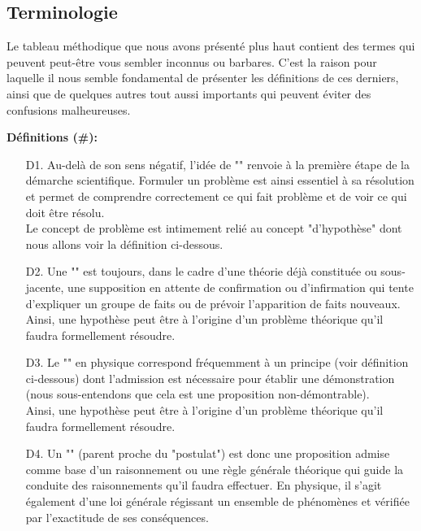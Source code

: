 	\pagebreak
	\subsection{Terminologie}

Le tableau m\'ethodique que nous avons pr\'esent\'e plus haut contient des termes qui peuvent peut-être vous sembler inconnus ou barbares. C'est la raison pour laquelle il nous semble fondamental de pr\'esenter les d\'efinitions de ces derniers, ainsi que de quelques autres tout aussi importants qui peuvent \'eviter des confusions malheureuses.

\textbf{D\'efinitions (\#\mydef):}

\begin{itemize}
	\item[D1.] Au-delà de son sens n\'egatif, l'id\'ee de "" renvoie à la première \'etape de la d\'emarche scientifique. Formuler un problème est ainsi essentiel à sa r\'esolution et permet de comprendre correctement ce qui fait problème et de voir ce qui doit être r\'esolu.\\
	
	Le concept de problème est intimement reli\'e au concept "d'hypothèse" dont nous allons voir la d\'efinition ci-dessous.

	\item[D2.] Une "" est toujours, dans le cadre d'une th\'eorie d\'ejà constitu\'ee ou sous-jacente, une supposition en attente de confirmation ou d'infirmation qui tente d'expliquer un groupe de faits ou de pr\'evoir l'apparition de faits nouveaux.\\
	
	Ainsi, une hypothèse peut être à l'origine d'un problème th\'eorique qu'il faudra formellement r\'esoudre. 

	\item[D3.] Le "" en physique correspond fr\'equemment à un principe (voir d\'efinition ci-dessous) dont l'admission est n\'ecessaire pour \'etablir une d\'emonstration (nous sous-entendons que cela est une proposition non-d\'emontrable).\\
	
	Ainsi, une hypothèse peut être à l'origine d'un problème th\'eorique qu'il faudra formellement r\'esoudre. 

	\item[D4.] Un "" (parent proche du "postulat") est donc une proposition admise comme base d'un raisonnement ou une règle g\'en\'erale th\'eorique qui guide la conduite des raisonnements qu'il faudra effectuer. En physique, il s'agit \'egalement d'une loi g\'en\'erale r\'egissant un ensemble de ph\'enomènes et v\'erifi\'ee par l'exactitude de ses cons\'equences.\\
	

\end{itemize}
